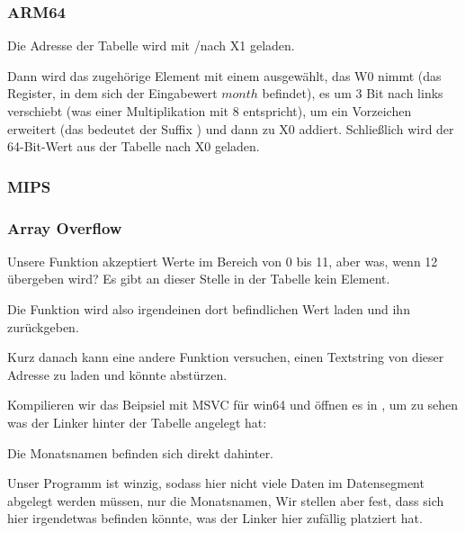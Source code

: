 \subsubsection{ARM64}



Die Adresse der Tabelle wird mit \ADRP/\ADD nach X1 geladen.

Dann wird das zugehörige Element mit einem \LDR ausgewählt, das W0 nimmt (das Register, in dem sich der Eingabewert
$month$ befindet), es um 3 Bit nach links verschiebt (was einer Multiplikation mit 8 entspricht), um ein Vorzeichen
erweitert (das bedeutet der Suffix ) und dann zu X0 addiert.
Schließlich wird der 64-Bit-Wert aus der Tabelle nach X0 geladen.

\subsubsection{MIPS}



\subsubsection{Array Overflow}
Unsere Funktion akzeptiert Werte im Bereich von 0 bis 11, aber was, wenn 12 übergeben wird?
Es gibt an dieser Stelle in der Tabelle kein Element.

Die Funktion wird also irgendeinen dort befindlichen Wert laden und ihn zurückgeben.

Kurz danach kann eine andere Funktion versuchen, einen Textstring von dieser Adresse zu laden und könnte abstürzen.

Kompilieren wir das Beipsiel mit MSVC für win64 und öffnen es in \IDA, um zu sehen was der Linker hinter der Tabelle
angelegt hat:


Die Monatsnamen befinden sich direkt dahinter.

Unser Programm ist winzig, sodass hier nicht viele Daten im Datensegment abgelegt werden müssen, nur die Monatsnamen,
Wir stellen aber fest, dass sich hier irgendetwas befinden könnte, was der Linker hier zufällig platziert hat.

